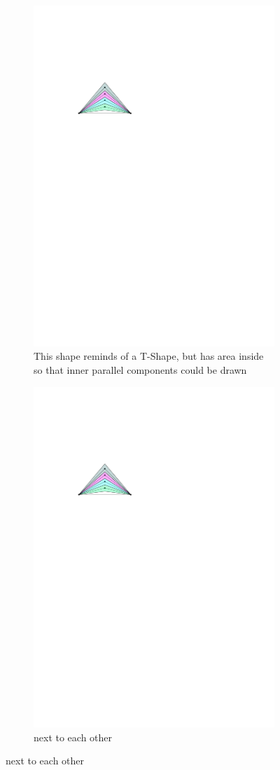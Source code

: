 \begin{figure}[H]
	\centering
\begin{subfigure}{0.4\textwidth}
	\centering
	\includegraphics[width=.7\linewidth,page=3]{drawings/2-trees.pdf}
	\caption{This shape reminds of a T-Shape, but has area inside so that inner parallel components could be drawn}
\end{subfigure}
\begin{subfigure}{0.4\textwidth}
	\centering
	\includegraphics[width=.7\linewidth,page=4]{drawings/2-trees.pdf}
	\caption{next to each other}
\end{subfigure}
\end{figure}
